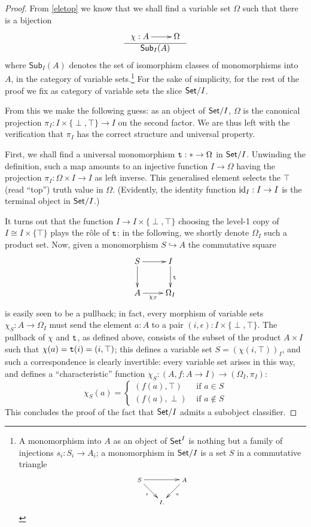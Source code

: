 \begin{proof}
	From \autoref{eletop} we know that we shall find a variable set $\Omega$ such that there is a bijection
	\[\begin{array}{c}
			\xymatrix{ \chi : A \ar[r] & \Omega} \\ \hline
			\textsf{Sub}_I(A)
		\end{array}\]
	where $\textsf{Sub}_I(A)$ denotes the set of isomorphism classes of monomorphisms into $A$, in the category of variable sets.\footnote{A monomorphism into $A$ as an object of $\mathsf{Set}^I$ is nothing but a family of injections $s_i : S_i \to A_i$; a monomorphism in $\mathsf{Set}/I$ is a set $S$ in a commutative triangle
	\[\scriptsize
		\xymatrix@!=1mm{S\ar[rr]\ar[dr]_s && A\ar[dl]^a \\ &I.&}\]}
	For the sake of simplicity, for the rest of the proof we fix as category of variable sets the slice $\mathsf{Set}/I$.

	From this we make the following guess: as an object of $\mathsf{Set}/I$, $\Omega$ is the canonical projection $\pi_I : I\times \{\perp,\top\} \to I$ on the second factor. We are thus left with the verification that $\pi_I$ has the correct structure and universal property.

	First, we shall find a universal monomorphism $\texttt{t} : * \to \Omega$ in $\mathsf{Set}/I$. Unwinding the definition, such a map amounts to an injective function $I\to \Omega$ having the projection $\pi_I : \Omega \times I \to I$ as left inverse. This generalised element selects the $\top$ (read ``top'') truth value in $\Omega$. (Evidently, the identity function $\text{id}_I : I \to I$ is the terminal object in $\mathsf{Set}/I$.)

	It turns out that the function $I \to I\times \{\perp,\top\}$ choosing the level-1 copy of $I\cong I\times \{\top\}$ plays the r\^ole of $\texttt{t}$: in the following, we shortly denote $\Omega_I$ such a product set. Now, given a monomorphism $S \hookrightarrow A$ the commutative square
	\[
		\vcenter{\xymatrix{
				S\ar[d]\ar[r] & I \ar[d]^{\true}\\
				A \ar[r]_-{\chi_S} & \Omega_I
			}}
	\]
	is easily seen to be a pullback; in fact, every morphism of variable sets $\chi_S : A \to \Omega_I$ must send the element $a : A$ to a pair $(i,\epsilon) : I\times \{\perp,\top\}$. The pullback of $\chi$ and $\texttt{t}$, as defined above, consists of the subset of the product $A\times I$ such that $\chi(a)=\texttt{t}(i)=(i,\top)$; this defines a variable set $S=(\chi(i,\top))_I$, and such a correspondence is clearly invertible: every variable set arises in this way, and defines a ``characteristic'' function $\chi_S : (A,f : A \to I) \to (\Omega_I,\pi_I)$:
	\[\chi_S(a) = 
	\begin{cases}
		(f(a), \top) & \text{ if } a\in S \\
		(f(a), \perp) & \text{ if } a\notin S 
	\end{cases}\]
	This concludes the proof of the fact that $\mathsf{Set}/I$ admits a subobject classifier.
\end{proof}
